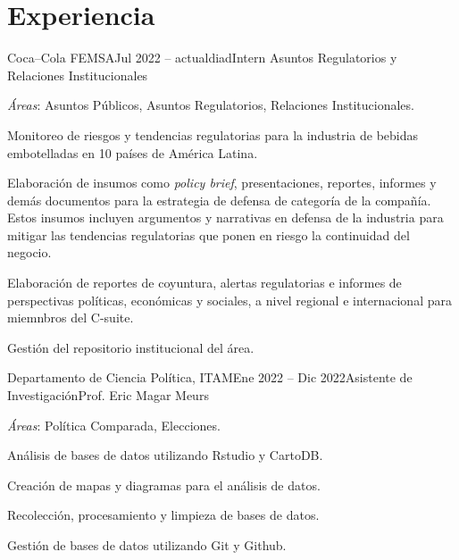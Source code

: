\documentclass[letter]{resume}
\begin{document}
\section{Experiencia}
\begin{content}

\begin{position}{Coca–Cola FEMSA}{Jul 2022 -- actualdiad}{Intern Asuntos Regulatorios y Relaciones Institucionales}{}{}

  \item {\emph{Áreas}}: Asuntos Públicos, Asuntos Regulatorios, Relaciones Institucionales.
  \item Monitoreo de riesgos y tendencias regulatorias para la industria de bebidas embotelladas en 10 países de América Latina.
  \item Elaboración de insumos como \emph{policy brief}, presentaciones, reportes, informes y demás documentos para la estrategia de defensa de categoría de la compañía. Estos insumos incluyen argumentos y narrativas en defensa de la industria para mitigar las tendencias regulatorias que ponen en riesgo la continuidad del negocio. 
  \item Elaboración de reportes de coyuntura, alertas regulatorias e informes de perspectivas políticas, económicas y sociales, a nivel regional e internacional para miemnbros del C-suite.
  \item Gestión del repositorio institucional del área.

\end{position}
\vspace{-.0001 \baselineskip}

\begin{position}{Departamento de Ciencia Política, ITAM}{Ene 2022 -- Dic 2022}{Asistente de Investigación}{Prof. Eric Magar Meurs}{}

  \item {\emph{Áreas}}: Política Comparada, Elecciones.
  \item Análisis de bases de datos utilizando Rstudio y CartoDB.
  \item Creación de mapas y diagramas para el análisis de datos.
  \item Recolección, procesamiento y limpieza de bases de datos.
  \item Gestión de bases de datos utilizando Git y Github.

\end{position}
\vspace{-.0001 \baselineskip}

\sectionlineskip
\end{content}
\end{document}
